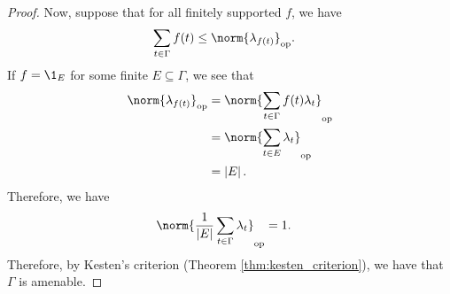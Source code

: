 \begin{proof}
  Now, suppose that for all finitely supported $f$, we have
  \begin{align*}
    \sum_{t\in\Gamma}f(t) &\leq \norm{\lambda_{f(t)}}_{\op}.
  \end{align*}
  If $f = \1_{E}$ for some finite $E\subseteq \Gamma$, we see that
  \begin{align*}
    \norm{\lambda_{f(t)}}_{\op} &= \norm{\sum_{t\in\Gamma}f(t)\lambda_t}_{\op}\\
                                &= \norm{\sum_{t\in E}\lambda_t}_{\op}\\
                                &= \left\vert E \right\vert.
  \end{align*}
  Therefore, we have
  \begin{align*}
    \norm{\frac{1}{\left\vert E \right\vert}\sum_{t\in\Gamma}\lambda_t}_{\op} &= 1.
  \end{align*}
  Therefore, by Kesten's criterion (Theorem \ref{thm:kesten_criterion}), we have that $\Gamma$ is amenable.
\end{proof}

